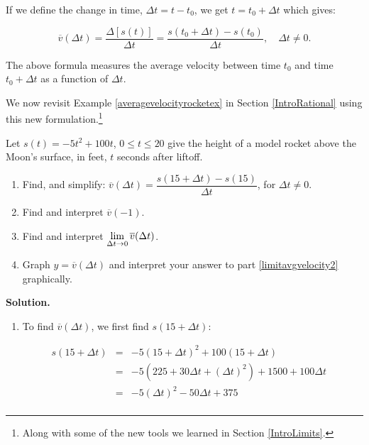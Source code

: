 \documentclass{ximera}
\begin{document}
If we define the change in time, $\Delta t = t - t_{0}$, we get $t = t_{0} + \Delta t$  which gives:

\[ \overline{v}(\Delta t) = \dfrac{\Delta [s(t)]}{\Delta t} = \dfrac{s(t_{0} + \Delta t) - s(t_{0})}{\Delta t}, \quad \Delta t \neq 0. \]

The above formula measures the average velocity between time $t_{0}$ and time $t_{0} + \Delta t$ as a function of $\Delta t$.

\medskip


We now revisit Example \ref{averagevelocityrocketex} in Section \ref{IntroRational} using this new formulation.\footnote{Along with some of the new tools we learned in Section \ref{IntroLimits}.}


\begin{ex} \label{averagevelocityrocketexreprise} Let $s(t) = -5t^2+100t$, $0 \leq t \leq 20$ give the height of a model rocket above the Moon's surface, in feet,  $t$ seconds after liftoff.  

\begin{enumerate}

\item  Find, and simplify:  $\overline{v}(\Delta t)  = \dfrac{s(15+ \Delta t) - s(15)}{\Delta t}$, for $\Delta t \neq 0$.

\item  Find and interpret $\overline{v}(-1)$.

\item  \label{limitavgvelocity2} Find and interpret $\ds{\lim_{\Delta t \rightarrow 0}  \overline{v}(\Delta t)}$.

\item  Graph $y = \overline{v}(\Delta t)$ and interpret your answer to part \ref{limitavgvelocity2} graphically.



\end{enumerate}


{\bf Solution.}

\begin{enumerate}

\item  To find $\overline{v}(\Delta t)$, we first find $s(15+\Delta t)$: 

\[ \begin{array}{rclr}  
  s(15+\Delta t) & = & -5(15+\Delta t)^2 + 100(15+\Delta t) & \\ 
  & = & -5(225+30 \Delta t + (\Delta t)^2) + 1500 + 100 \Delta t& \\
 & = & -5(\Delta t)^2 -50 \Delta t +375 & \\
 \end{array} \]


\end{enumerate}
\end{ex}
\end{document}
